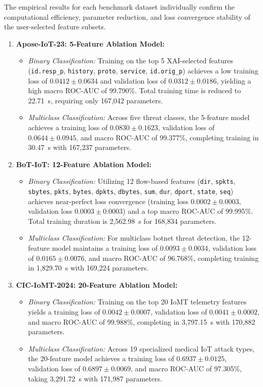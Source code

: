 \documentclass[a4paper,fleqn]{cas-sc}
\begin{document}
The empirical results for each benchmark dataset individually confirm the computational efficiency, parameter reduction, and loss convergence stability of the user-selected feature subsets.

\begin{enumerate}
    \item \textbf{Apose-IoT-23: 5-Feature Ablation Model:}
    \begin{itemize}
        \item \textit{Binary Classification:} Training on the top 5 XAI-selected features (\texttt{id.resp\_p}, \texttt{history}, \texttt{proto}, \texttt{service}, \texttt{id.orig\_p}) achieves a low training loss of $0.0412 \pm 0.0634$ and validation loss of $0.0312 \pm 0.0186$, yielding a high macro ROC-AUC of 99.790\%. Total training time is reduced to 22.71~s, requiring only 167,042 parameters.
        \item \textit{Multiclass Classification:} Across five threat classes, the 5-feature model achieves a training loss of $0.0830 \pm 0.1623$, validation loss of $0.0644 \pm 0.0945$, and macro ROC-AUC of 99.377\%, completing training in 30.47~s with 167,237 parameters.
    \end{itemize}

    \item \textbf{BoT-IoT: 12-Feature Ablation Model:}
    \begin{itemize}
        \item \textit{Binary Classification:} Utilizing 12 flow-based features (\texttt{dir}, \texttt{spkts}, \texttt{sbytes}, \texttt{pkts}, \texttt{bytes}, \texttt{dpkts}, \texttt{dbytes}, \texttt{sum}, \texttt{dur}, \texttt{dport}, \texttt{state}, \texttt{seq}) achieves near-perfect loss convergence (training loss $0.0002 \pm 0.0003$, validation loss $0.0003 \pm 0.0003$) and a top macro ROC-AUC of 99.995\%. Total training duration is 2,562.98~s for 168,834 parameters.
        \item \textit{Multiclass Classification:} For multiclass botnet threat detection, the 12-feature model maintains a training loss of $0.0093 \pm 0.0034$, validation loss of $0.0165 \pm 0.0076$, and macro ROC-AUC of 96.768\%, completing training in 1,829.70~s with 169,224 parameters.
    \end{itemize}

    \item \textbf{CIC-IoMT-2024: 20-Feature Ablation Model:}
    \begin{itemize}
        \item \textit{Binary Classification:} Training on the top 20 IoMT telemetry features yields a training loss of $0.0042 \pm 0.0007$, validation loss of $0.0041 \pm 0.0002$, and macro ROC-AUC of 99.988\%, completing in 3,797.15~s with 170,882 parameters.
        \item \textit{Multiclass Classification:} Across 19 specialized medical IoT attack types, the 20-feature model achieves a training loss of $0.6937 \pm 0.0125$, validation loss of $0.6897 \pm 0.0069$, and macro ROC-AUC of 97.305\%, taking 3,291.72~s with 171,987 parameters.
    \end{itemize}


\end{enumerate}
\end{document}
